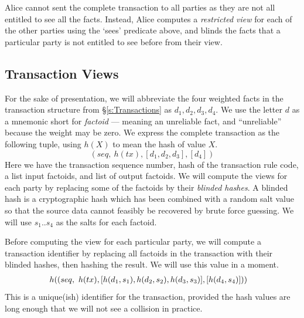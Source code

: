 Alice cannot sent the complete transaction to all parties as they are not all entitled to see all the facts. Instead, Alice computes a \emph{restricted view} for each of the other parties using the `sees' predicate above, and blinds the facts that a particular party is not entitled to see before from their view.


\subsection{Transaction Views}

For the sake of presentation, we will abbreviate the four weighted facts in the transaction structure from \S\ref{s:Transactions} as $d_1, d_2, d_3, d_4$. We use the letter $d$ as a mnemonic short for \emph{factoid} --- meaning an unreliable fact, and ``unreliable'' because the weight may be zero. We express the complete transaction as the following tuple, using $h(X)$ to mean the hash of value $X$.
$$
 (seq,~ h(tx), [d_1, d_2, d_3], [d_4])
$$
Here we have the transaction sequence number, hash of the transaction rule code, a list input factoids, and list of output factoids. We will compute the views for each party by replacing some of the factoids by their \emph{blinded hashes}. A blinded hash is a cryptographic hash which has been combined with a random salt value so that the source data cannot feasibly be recovered by brute force guessing. We will use $s_1 .. s_4$ as the salts for each factoid.

Before computing the view for each particular party, we will compute a transaction identifier by replacing all factoids in the transaction with their blinded hashes, then hashing the result. We will use this value in a moment.
$$
\begin{array}{rl}
 \hspace{-2ex} h((seq,~ h(tx), [h(d_1, s_1), h(d_2, s_2), h(d_3, s_3)], [h(d_4, s_4)]))
\end{array}
$$
This is a unique(ish) identifier for the transaction, provided the hash values are long enough that we will not see a collision in practice.

